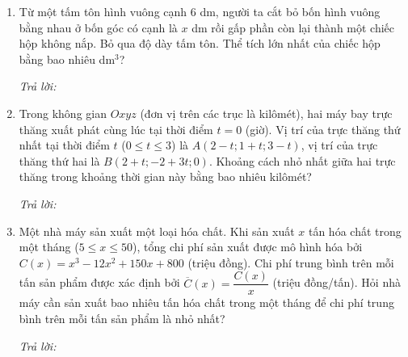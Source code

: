 \documentclass[12pt,a4paper]{article}
\newcommand{\otraloi}{\par\nobreak\smallskip\noindent\textit{Trả lời:}\quad\fbox{\rule{0pt}{11pt}\makebox[0.3cm]{}}\,\fbox{\rule{0pt}{11pt}\makebox[0.3cm]{}}\,\fbox{\rule{0pt}{11pt}\makebox[0.3cm]{}}\,\fbox{\rule{0pt}{11pt}\makebox[0.3cm]{}}}
\begin{document}
\newpage
\begin{enumerate}[start=3]
\item Từ một tấm tôn hình vuông cạnh $6$ dm, người ta cắt bỏ bốn hình vuông bằng nhau ở bốn góc có cạnh là $x$ dm rồi gấp phần còn lại thành một chiếc hộp không nắp. Bỏ qua độ dày tấm tôn. Thể tích lớn nhất của chiếc hộp bằng bao nhiêu dm$^3$?
\begin{center}
\par{}
\end{center}
\otraloi

\item Trong không gian $Oxyz$ (đơn vị trên các trục là kilômét), hai máy bay trực thăng xuất phát cùng lúc tại thời điểm $t=0$ (giờ). Vị trí của trực thăng thứ nhất tại thời điểm $t$ ($0\le t\le3$) là $A(2-t;1+t;3-t)$, vị trí của trực thăng thứ hai là $B(2+t;-2+3t;0)$. Khoảng cách nhỏ nhất giữa hai trực thăng trong khoảng thời gian này bằng bao nhiêu kilômét?
\otraloi

\item Một nhà máy sản xuất một loại hóa chất. Khi sản xuất $x$ tấn hóa chất trong một tháng ($5\le x\le50$), tổng chi phí sản xuất được mô hình hóa bởi $C(x)=x^3-12x^2+150x+800$ (triệu đồng). Chi phí trung bình trên mỗi tấn sản phẩm được xác định bởi $\overline{C}(x)=\dfrac{C(x)}{x}$ (triệu đồng/tấn). Hỏi nhà máy cần sản xuất bao nhiêu tấn hóa chất trong một tháng để chi phí trung bình trên mỗi tấn sản phẩm là nhỏ nhất?
\otraloi


\end{enumerate}
\end{document}
